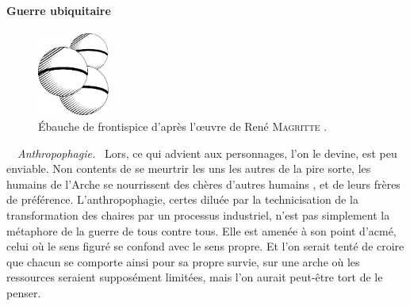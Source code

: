 \paragraph{Guerre ubiquitaire}%
\begin{figure}
	\vspace{-1em}
	\centering
	\includegraphics[width=0.21\textwidth]{frontispice-voix-des-airs.pdf}
	\caption{Ébauche de frontispice d’après l’œuvre de René \textsc{Magritte} .}
	\vspace{-2.0em}
\end{figure}
\
\
{\em\normalsize Anthropophagie.}~
Lors, ce qui advient aux personnages, l’on le devine, est peu enviable. Non contents de se meurtrir les uns les autres de la pire sorte, les humains de l’Arche se nourrissent des chères d’autres humains , et de leurs frères de préférence.
L’anthropophagie, certes diluée par la technicisation de la transformation des chaires par un processus industriel, n’est pas simplement la métaphore de la guerre de tous contre tous. Elle est amenée à son point d’acmé, celui où le sens figuré se confond avec le sens propre. 
Et l’on serait tenté de croire que chacun se comporte ainsi pour sa propre survie, sur une arche où les ressources seraient supposément limitées, mais l’on aurait peut-être tort de le penser.


